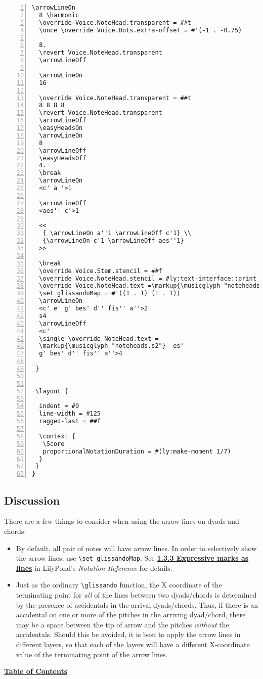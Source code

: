 \begin{Verbatim}[numbers=left,xleftmargin=5mm]
  \arrowLineOn
  8 \harmonic
  \override Voice.NoteHead.transparent = ##t
  \once \override Voice.Dots.extra-offset = #'(-1 . -0.75)

  8.
  \revert Voice.NoteHead.transparent
  \arrowLineOff

  \arrowLineOn
  16

  \override Voice.NoteHead.transparent = ##t
  8 8 8 8
  \revert Voice.NoteHead.transparent
  \arrowLineOff
  \easyHeadsOn
  \arrowLineOn
  8
  \arrowLineOff
  \easyHeadsOff
  4.
  \break
  \arrowLineOn
  <c' a''>1

  \arrowLineOff
  <aes'' c'>1

  <<
   { \arrowLineOn a''1 \arrowLineOff c'1} \\
   {\arrowLineOn c'1 \arrowLineOff aes''1}
  >>

  \break
  \override Voice.Stem.stencil = ##f
  \override Voice.NoteHead.stencil = #ly:text-interface::print
  \override Voice.NoteHead.text =\markup{\musicglyph "noteheads.s1"}
  \set glissandoMap = #'((1 . 1) (1 . 1))
  \arrowLineOn
  <c' e' g' bes' d'' fis'' a''>2
  s4
  \arrowLineOff
  <c'
  \single \override NoteHead.text =
  \markup{\musicglyph "noteheads.s2"}  es'
  g' bes' d'' fis'' a''>4

 }


 \layout {

  indent = #0
  line-width = #125
  ragged-last = ##f

  \context {
   \Score
   proportionalNotationDuration = #(ly:make-moment 1/7)
  }
 }
}
\end{Verbatim}
\subsection{Discussion}
\label{sec:arrow_lines_discussion}
There are a few things to consider when using the arrow lines on dyads and chords:
\begin{itemize}
\item By default, all pair of notes will have arrow lines. In order to selectively show the arrow lines, use \verb|\set glissandoMap|. See \href{https://lilypond.org/doc/v2.24/Documentation/notation/expressive-marks-as-lines}{\textbf{1.3.3 Expressive marks as lines}} in LilyPond's \textit{Notation Reference} for details.
\item  Just as the ordinary \verb|\glissando| function, the X coordinate of the terminating point for \textit{all} of the lines between two dyads/chords is determined by the presence of accidentals in the arrival dyads/chords. Thus, if there is an accidental on one or more of the pitches in the arriving dyad/chord, there may be a space between the tip of arrow and the pitches \textit{without} the accidentals. Should this be avoided, it is best to apply the arrow lines in different layers, so that each of the layers will have a different X-coordinate value of the terminating point of the arrow lines.
\end {itemize}
\hyperref[sec:toc]{\textbf{Table of Contents}}

